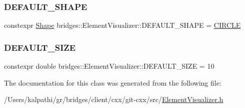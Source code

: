 \subsubsection{\texorpdfstring{D\+E\+F\+A\+U\+L\+T\+\_\+\+S\+H\+A\+PE}{DEFAULT\_SHAPE}}
{\footnotesize\ttfamily constexpr \hyperlink{namespacebridges_a1b4050586bd708782ae0d4f3b06b9579}{Shape} bridges\+::\+Element\+Visualizer\+::\+D\+E\+F\+A\+U\+L\+T\+\_\+\+S\+H\+A\+PE = \hyperlink{namespacebridges_a1b4050586bd708782ae0d4f3b06b9579aa968bf0f7aeccbae1a40751345bf2e64}{C\+I\+R\+C\+LE}\hspace{0.3cm}{\ttfamily [static]}}

\hypertarget{classbridges_1_1_element_visualizer_a81cc788d6149d5d582099cbc35e18c5a}{}\label{classbridges_1_1_element_visualizer_a81cc788d6149d5d582099cbc35e18c5a} 
\subsubsection{\texorpdfstring{D\+E\+F\+A\+U\+L\+T\+\_\+\+S\+I\+ZE}{DEFAULT\_SIZE}}
{\footnotesize\ttfamily constexpr double bridges\+::\+Element\+Visualizer\+::\+D\+E\+F\+A\+U\+L\+T\+\_\+\+S\+I\+ZE = 10\hspace{0.3cm}{\ttfamily [static]}}



The documentation for this class was generated from the following file\+:\begin{DoxyCompactItemize}
\item 
/\+Users/kalpathi/gr/bridges/client/cxx/git-\/cxx/src/\hyperlink{_element_visualizer_8h}{Element\+Visualizer.\+h}\end{DoxyCompactItemize}
